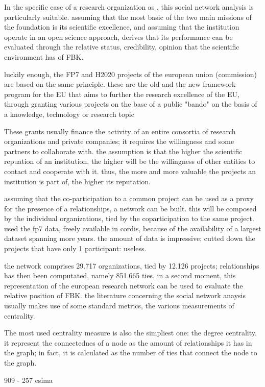 In the specific case of a research organization as , this social network analysis is particularly suitable. assuming that the most basic of the two main missions of the foundation is its scientific excellence, and assuming that the institution operate in an open science approach, derives that its performance can be evaluated through the relative status, credibility, opinion that the scientific environment has of FBK.

luckily enough, the FP7 and H2020 projects of the european union (commission) are based on the same principle. these are the old and the new framework program for the EU that aims to further the research excellence of the EU, through granting various projects on the base of a public "bando" on the basis of a knowledge, technology or research topic

These grants usually finance the activity of an entire consortia of research organizations and private companies; it requires the willingness and some partners to collaborate with. the assumption is that the higher the scientific repuation of an institution, the higher will be the willingness of other entities to contact and cooperate with it. thus, the more and more valuable the projects an institution is part of, the higher its reputation.

assuming that the co-participation to a common project can be used as a proxy for the presence of a relationships, a network can be built. this will be composed by the individual organizations, tied by the coparticipation to the same project. used the fp7 data, freely available in cordis, because of the availability of a largest dataset spanning more years. the amount of data is impressive; cutted down the projects that have only 1 participant: useless.

the network comprises 29.717 organizations, tied by 12.126 projects; relationships has then been computated, namely 851.665 ties. in a second moment, this representation of the european research network can be used to evaluate the relative position of FBK. the literature concerning the social network anaysis usually makes use of some standard metrics, the various measurements of centrality.

The most used centrality measure is also the simpliest one: the degree centrality. it represent the connectednes of a node as the amount of relationships it has in the graph; in fact, it is calculated as the number of ties that connect the node to the graph. 

909 - 257 esima

